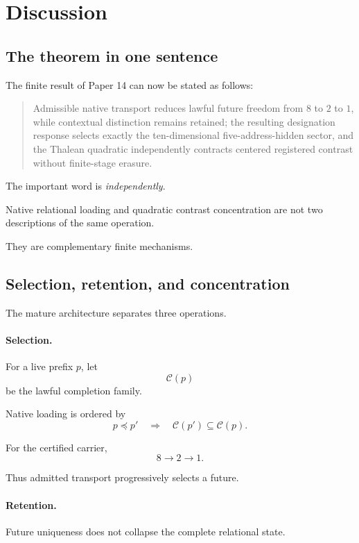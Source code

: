 \section{Discussion}

\subsection{The theorem in one sentence}

The finite result of Paper 14 can now be stated as follows:

\begin{quote}
Admissible native transport reduces lawful future freedom from
\(8\) to \(2\) to \(1\), while contextual distinction remains
retained; the resulting designation response selects exactly the
ten-dimensional five-address-hidden sector, and the Thalean
quadratic independently contracts centered registered contrast
without finite-stage erasure.
\end{quote}

The important word is \emph{independently}.

Native relational loading and quadratic contrast concentration are
not two descriptions of the same operation.

They are complementary finite mechanisms.

\subsection{Selection, retention, and concentration}

The mature architecture separates three operations.

\paragraph{Selection.}
For a live prefix \(p\), let
\[
\mathcal C(p)
\]
be the lawful completion family.

Native loading is ordered by
\[
p\preceq p'
\quad\Longrightarrow\quad
\mathcal C(p')\subseteq\mathcal C(p).
\]

For the certified carrier,
\[
8\longrightarrow2\longrightarrow1.
\]

Thus admitted transport progressively selects a future.

\paragraph{Retention.}
Future uniqueness does not collapse the complete relational state.

